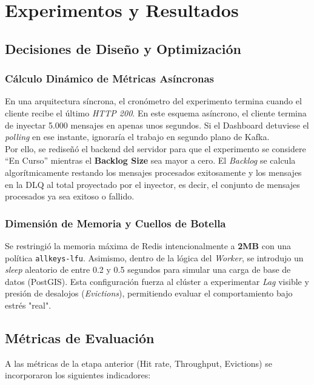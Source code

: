 \documentclass[letter,12pt]{article}
\begin{document}
\section{Experimentos y Resultados}

\subsection{Decisiones de Diseño y Optimización}

\subsubsection{Cálculo Dinámico de Métricas Asíncronas}
En una arquitectura síncrona, el cronómetro del experimento termina cuando el cliente recibe el último \textit{HTTP 200}. En este esquema asíncrono, el cliente termina de inyectar 5.000 mensajes en apenas unos segundos. Si el Dashboard detuviese el \textit{polling} en ese instante, ignoraría el trabajo en segundo plano de Kafka. 
\\
Por ello, se rediseñó el backend del servidor para que el experimento se considere ``En Curso'' mientras el \textbf{Backlog Size} sea mayor a cero. El \textit{Backlog} se calcula algorítmicamente restando los mensajes procesados exitosamente y los mensajes en la DLQ al total proyectado por el inyector, es decir, el conjunto de mensajes procesados ya sea exitoso o fallido.

\subsubsection{Dimensión de Memoria y Cuellos de Botella}
Se restringió la memoria máxima de Redis intencionalmente a \textbf{2MB} con una política \texttt{allkeys-lfu}. Asimismo, dentro de la lógica del \textit{Worker}, se introdujo un \textit{sleep} aleatorio de entre 0.2 y 0.5 segundos para simular una carga de base de datos (PostGIS). Esta configuración fuerza al clúster a experimentar \textit{Lag} visible y presión de desalojos (\textit{Evictions}), permitiendo evaluar el comportamiento bajo estrés "real".

\subsection{Métricas de Evaluación}

A las métricas de la etapa anterior (Hit rate, Throughput, Evictions) se incorporaron los siguientes indicadores:
\end{document}
